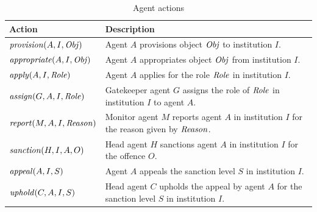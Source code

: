\begin{table}
\centering
\caption{Agent actions}\label{table:agact}
\begin{tabular}{ l | p{}}
\hline
Action & Description \\
\hline
$\mathit{provision}(A,I,\mathit{Obj})$ & Agent $A$ provisions object $\mathit{Obj}$ to institution $I$. \\
$\mathit{appropriate}(A,I,\mathit{Obj})$ & Agent $A$ appropriates object $\mathit{Obj}$ from institution $I$. \\
$\mathit{apply}(A,I,\mathit{Role})$ & Agent $A$ applies for the role $\mathit{Role}$ in institution $I$. \\
$\mathit{assign}(G,A,I,\mathit{Role})$ & Gatekeeper agent $G$ assigns the role of $\mathit{Role}$ in institution $I$ to agent $A$. \\
$\mathit{report}(M,A,I,\mathit{Reason})$ & Monitor agent $M$ reports agent $A$ in institution $I$ for the reason given by $\mathit{Reason}$. \\
$\mathit{sanction}(H,I,A,O)$ & Head agent $H$ sanctions agent $A$ in institution $I$ for the offence $O$.\\
$\mathit{appeal}(A,I,S)$ & Agent $A$ appeals the sanction level $S$ in institution $I$. \\
$\mathit{uphold}(C,A,I,S)$ & Head agent $C$ upholds the appeal by agent $A$ for the sanction level $S$ in institution $I$.
\end{tabular}
\end{table}
%
